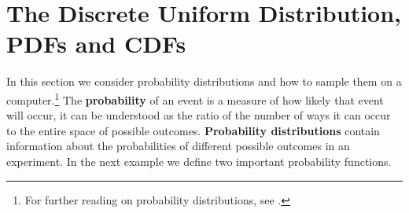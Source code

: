 \section{The Discrete Uniform Distribution, PDFs and CDFs}\label{sec2:discreteuni}

In this section we consider probability distributions and how to sample them on a computer.\footnote{For further reading on probability distributions, see \cite{larsenmarx2004}.}
The \textbf{probability} of an event is a measure of how likely that event will occur, it can be understood as the ratio of the number of ways it can occur to the entire space of possible outcomes.
\textbf{Probability distributions} contain information about the probabilities of different possible outcomes in an experiment.
In the next example we define two important probability functions.

